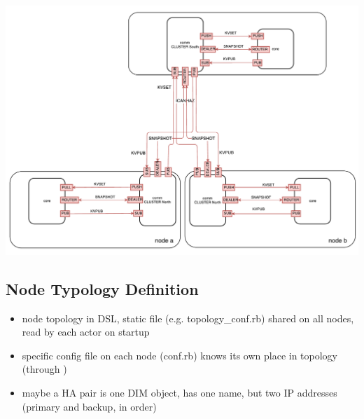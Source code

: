 \includegraphics[width=\textwidth]{img/cluster_protocol.pdf}

\subsection{Node Typology Definition}

\begin{itemize}
	\item node topology in DSL, static file (e.g. topology\_conf.rb) shared on all nodes, read by each actor on startup
	\item specific config file on each node (conf.rb) knows its own place in topology (through )
	\item maybe a HA pair is one DIM object, has one name, but two IP addresses (primary and backup, in order)
\end{itemize}

